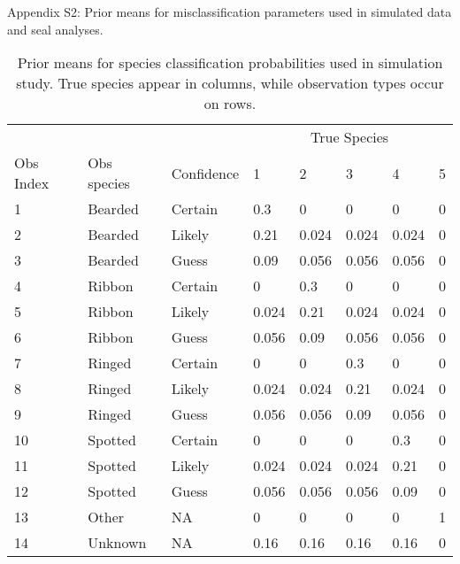 \documentclass[12pt,fleqn]{article}
\begin{document}
\rm \begin{flushleft}

\raggedbottom

\begin{center}
Appendix S2: Prior means for misclassification parameters used in simulated data and seal analyses.
\bigskip
\end{center}

\pagebreak

\begin{table}
\caption{Prior means for species classification probabilities used in simulation study.  True species
appear in columns, while observation types occur on rows.}
\begin{tabular}{llllllll}
\hline
& & & \multicolumn{5}{c}{True Species} \\ \cline{4-8}
Obs Index & Obs species & Confidence & 1 & 2 & 3 & 4 & 5 \\
1 & Bearded & Certain & 0.3  & 0 & 0 & 0 & 0 \\
2 & Bearded & Likely &  0.21 & 0.024 & 0.024 & 0.024 & 0 \\
3 & Bearded & Guess &  0.09 & 0.056 & 0.056 & 0.056 & 0 \\
4 & Ribbon & Certain & 0 & 0.3 & 0 & 0 & 0 \\
5 & Ribbon & Likely & 0.024 & 0.21 & 0.024 & 0.024 & 0 \\
6 & Ribbon & Guess & 0.056 & 0.09 & 0.056 & 0.056 & 0 \\
7 & Ringed & Certain & 0 & 0 & 0.3 & 0 & 0 \\
8 & Ringed & Likely & 0.024 & 0.024 & 0.21 & 0.024 & 0 \\
9 & Ringed & Guess & 0.056 & 0.056 & 0.09 & 0.056 & 0 \\
10 & Spotted & Certain & 0 & 0 & 0 & 0.3 & 0 \\
11 & Spotted & Likely & 0.024 & 0.024 & 0.024 & 0.21 & 0 \\
12 & Spotted & Guess & 0.056 & 0.056 & 0.056 & 0.09 & 0 \\
13 & Other & NA & 0 & 0 & 0 & 0 & 1 \\
14 & Unknown & NA & 0.16 & 0.16 & 0.16 & 0.16 & 0 \\
\hline
\end{tabular}
\label{tab:confuse_sim}
\end{table}


\end{flushleft}
\end{document}
